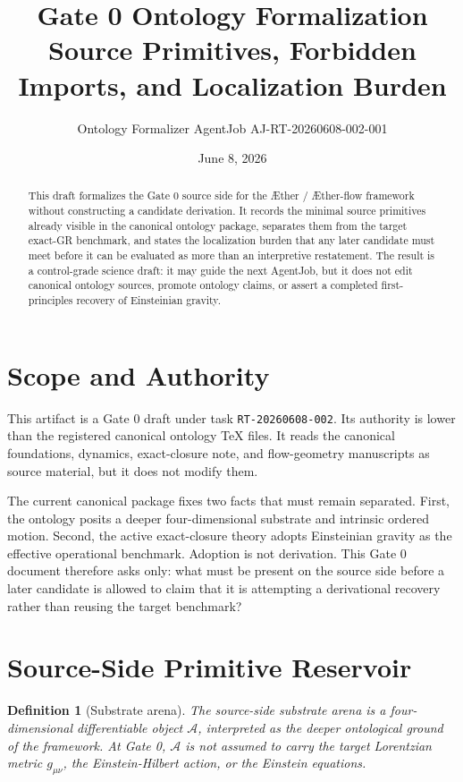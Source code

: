 \documentclass[11pt]{article}
\title{\textbf{Gate 0 Ontology Formalization}\\[0.35em]
\large Source Primitives, Forbidden Imports, and Localization Burden}
\author{Ontology Formalizer AgentJob AJ-RT-20260608-002-001}
\date{June 8, 2026}
\newcommand{\Aether}{\AE{}ther}
\newcommand{\Aflow}{\AE{}ther-flow}
\newcommand{\TheoryProgram}{\Aether{} / \Aflow{} framework}
\newcommand{\Sub}{\mathcal{A}}
\newtheorem{definition}{Definition}
\begin{document}
\maketitle

\begin{abstract}
This draft formalizes the Gate 0 source side for the \TheoryProgram{} without
constructing a candidate derivation. It records the minimal source primitives
already visible in the canonical ontology package, separates them from the
target exact-GR benchmark, and states the localization burden that any later
candidate must meet before it can be evaluated as more than an interpretive
restatement. The result is a control-grade science draft: it may guide the next
AgentJob, but it does not edit canonical ontology sources, promote ontology
claims, or assert a completed first-principles recovery of Einsteinian gravity.
\end{abstract}

\section{Scope and Authority}

This artifact is a Gate 0 draft under task \texttt{RT-20260608-002}. Its
authority is lower than the registered canonical ontology TeX files. It reads
the canonical foundations, dynamics, exact-closure note, and flow-geometry
manuscripts as source material, but it does not modify them.

The current canonical package fixes two facts that must remain separated.
First, the ontology posits a deeper four-dimensional substrate and intrinsic
ordered motion. Second, the active exact-closure theory adopts Einsteinian
gravity as the effective operational benchmark. Adoption is not derivation.
This Gate 0 document therefore asks only: what must be present on the source
side before a later candidate is allowed to claim that it is attempting a
derivational recovery rather than reusing the target benchmark?

\section{Source-Side Primitive Reservoir}

\begin{definition}[Substrate arena]
The source-side substrate arena is a four-dimensional differentiable object
\(\Sub\), interpreted as the deeper ontological ground of the framework. At
Gate 0, \(\Sub\) is not assumed to carry the target Lorentzian metric
\(g_{\mu\nu}\), the Einstein-Hilbert action, or the Einstein equations.
\end{definition}
\end{document}
